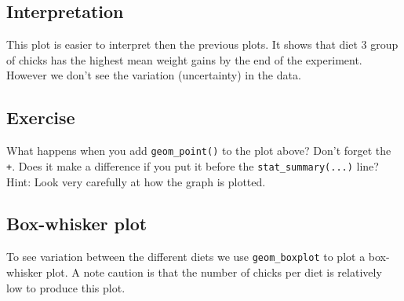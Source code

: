 \documentclass[a4paper,9pt,twocolumn,twoside,printwatermark=false]{pinp}
\begin{document}
\subsection{Interpretation}\label{interpretation-3}

This plot is easier to interpret then the previous plots. It shows that
diet 3 group of chicks has the highest mean weight gains by the end of
the experiment. However we don't see the variation (uncertainty) in the
data.

\subsection{Exercise}\label{exercise-6}

What happens when you add \texttt{geom\_point()} to the plot above?
Don't forget the \texttt{+}. Does it make a difference if you put it
before the \texttt{stat\_summary(...)} line? Hint: Look very carefully
at how the graph is plotted.

\subsection{Box-whisker plot}\label{box-whisker-plot}

To see variation between the different diets we use
\texttt{geom\_boxplot} to plot a box-whisker plot. A note caution is
that the number of chicks per diet is relatively low to produce this
plot.

\begin{Shaded}
\begin{Highlighting}[]
\OperatorTok{+}
\StringTok{  }\NormalTok{(}\OperatorTok{~}\OperatorTok{+}
\StringTok{  }\NormalTok{() }\OperatorTok{+}
\StringTok{  }\NormalTok{(} \NormalTok{) }\OperatorTok{+}
\StringTok{  }\NormalTok{(}\NormalTok{)}
\end{Highlighting}
\end{Shaded}
\end{document}
